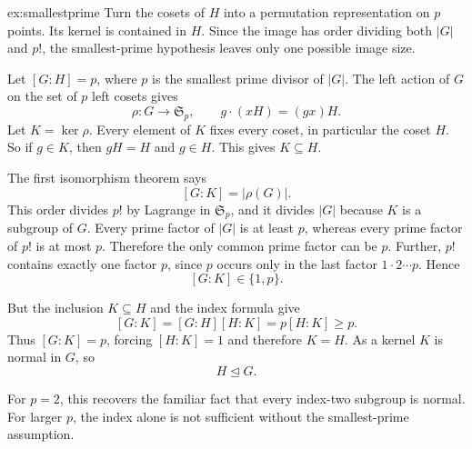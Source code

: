 \begin{solution}{ex:smallestprime}
\idea Turn the cosets of $H$ into a permutation representation on $p$ points. Its kernel is contained in $H$. Since the image has order dividing both $|G|$ and $p!$, the smallest-prime hypothesis leaves only one possible image size.

\writeup Let $[G:H]=p$, where $p$ is the smallest prime divisor of $|G|$. The left action of $G$ on the set of $p$ left cosets gives
\[
\rho:G\longrightarrow\mathfrak S_p,\qquad
g\cdot(xH)=(gx)H.
\]
Let $K=\ker\rho$. Every element of $K$ fixes every coset, in particular the coset $H$. So if $g\in K$, then $gH=H$ and $g\in H$. This gives $K\subseteq H$.

The first isomorphism theorem says
\[
[G:K]=|\rho(G)|.
\]
This order divides $p!$ by Lagrange in $\mathfrak S_p$, and it divides $|G|$ because $K$ is a subgroup of $G$. Every prime factor of $|G|$ is at least $p$, whereas every prime factor of $p!$ is at most $p$. Therefore the only common prime factor can be $p$. Further, $p!$ contains exactly one factor $p$, since $p$ occurs only in the last factor $1\cdot2\cdots p$. Hence
\[
[G:K]\in\{1,p\}.
\]

But the inclusion $K\subseteq H$ and the index formula give
\[
[G:K]=[G:H][H:K]=p[H:K]\ge p.
\]
Thus $[G:K]=p$, forcing $[H:K]=1$ and therefore $K=H$. As a kernel $K$ is normal in $G$, so
\[
\boxed{H\trianglelefteq G}.
\]

For $p=2$, this recovers the familiar fact that every index-two subgroup is normal. For larger $p$, the index alone is not sufficient without the smallest-prime assumption.
\end{solution}

